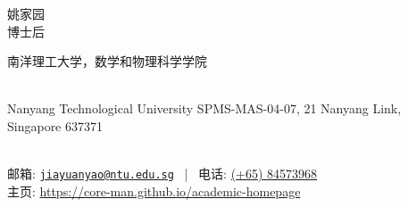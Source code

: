 \documentclass[11pt, a4paper]{article}
\makeatletter
\newcommand{\MyName}{姚家园}
\newcommand{\MyRole}{博士后}
\newcommand{\Email}{jiayuanyao@ntu.edu.sg}
\newcommand{\Website}{https://core-man.github.io/academic-homepage}
\newcommand{\Phone}{(+65) 84573968}
\newcommand{\Affiliation}{
    南洋理工大学，数学和物理科学学院
}
\newcommand{\Address}{
    Nanyang Technological University SPMS-MAS-04-07, 21 Nanyang Link, Singapore 637371
}
\newcommand{\makefield}[2]{\makebox[1.5em]{\color{MarkerColour!80!black}#1} #2}
\makeatother
\begin{document}
\thispagestyle{empty}

\begin{center}
    {\fontsize{30pt}{0}\selectfont \MyName}
    \\[0.5cm]
    {\fontsize{18pt}{0}\selectfont \MyRole}
    \\[0.3cm]
    {\fontsize{11pt}{0}\selectfont
        \Affiliation
        \\[0.2cm]
        \Address
        \\[0.08cm]
        邮箱: \href{mailto:\Email}{\texttt{\Email}}
        \, | \,
        电话: \url{\Phone}
        \\[0.08cm]
        主页: \url{\Website}
    }
\end{center}















%
%
\end{document}
